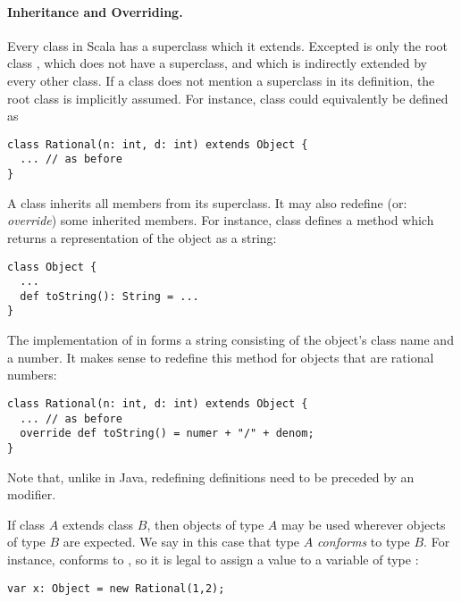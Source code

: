 \documentclass[11pt]{book}
\begin{document}
\paragraph{Inheritance and Overriding.}
Every class in Scala has a superclass which it extends.
Excepted is only the root class \verb@Object@, which does not have a
superclass, and which is indirectly extended by every other class.
If a class does not mention a superclass in its definition, the root
class \verb@Object@ is implicitly assumed. For instance, class
\verb@Rational@ could equivalently be defined as
\begin{verbatim}
class Rational(n: int, d: int) extends Object {
  ... // as before
}
\end{verbatim}
A class inherits all members from its superclass. It may also redefine
(or: {\em override}) some inherited members. For instance, class
\verb@Object@ defines
a method
\verb@toString@ which returns a representation of the object as a string:
\begin{verbatim}
class Object {
  ...
  def toString(): String = ...
}
\end{verbatim}
The implementation of \verb@toString@ in \verb@Object@
forms a string consisting of the object's class name and a number. It
makes sense to redefine this method for objects that are rational
numbers:
\begin{verbatim}
class Rational(n: int, d: int) extends Object {
  ... // as before
  override def toString() = numer + "/" + denom;
}
\end{verbatim}
Note that, unlike in Java, redefining definitions need to be preceded
by an \verb@override@ modifier.

If class $A$ extends class $B$, then objects of type $A$ may be used
wherever objects of type $B$ are expected. We say in this case that
type $A$ {\em conforms} to type $B$.  For instance, \verb@Rational@
conforms to \verb@Object@, so it is legal to assign a \verb@Rational@
value to a variable of type \verb@Object@:
\begin{verbatim}
var x: Object = new Rational(1,2);
\end{verbatim}
\end{document}

